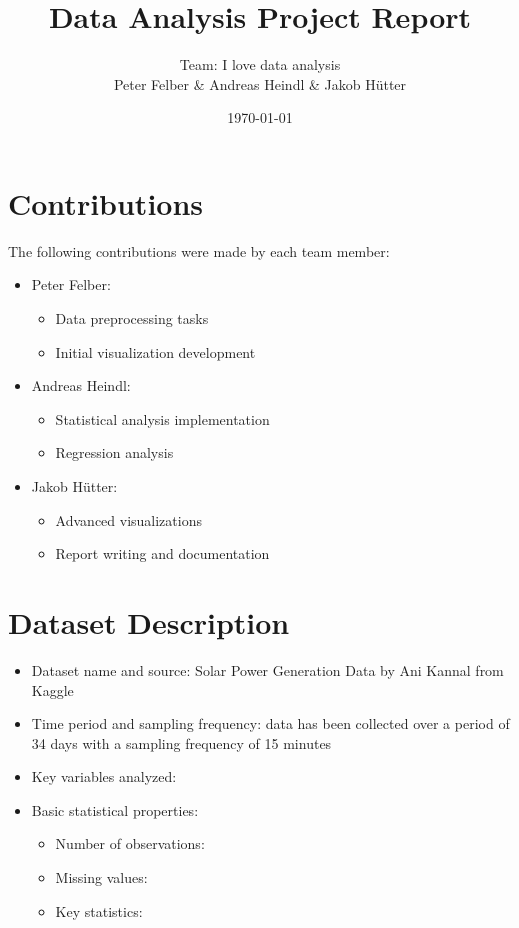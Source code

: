 \documentclass[11pt]{article}
\title{Data Analysis Project Report}
\author{
  Team: I love data analysis\\ 
  Peter Felber \& Andreas Heindl \& Jakob Hütter
}
\date{\today}
\begin{document}
\maketitle

\begin{center}
\end{center}

\section{Contributions}
The following contributions were made by each team member:
\begin{itemize}
    \item Peter Felber:
    \begin{itemize}
        \item Data preprocessing tasks
        \item Initial visualization development
    \end{itemize}
    \item Andreas Heindl:
    \begin{itemize}
        \item Statistical analysis implementation
        \item Regression analysis
    \end{itemize}
    \item Jakob Hütter:
    \begin{itemize}
        \item Advanced visualizations
        \item Report writing and documentation
    \end{itemize}
\end{itemize}

\section{Dataset Description}
\begin{itemize}
    \item Dataset name and source: Solar Power Generation Data by Ani Kannal from Kaggle
    \item Time period and sampling frequency: data has been collected over a period of 34 days with a sampling frequency of 15 minutes
    \item Key variables analyzed:
    \item Basic statistical properties:
    \begin{itemize}
        \item Number of observations:
        \item Missing values:
        \item Key statistics:
    \end{itemize}
\end{itemize}
\end{document}
